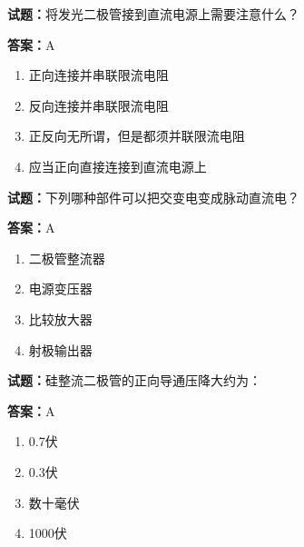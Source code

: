 \documentclass{ctexbook}
\begin{document}




\vspace{1em}

\textbf{试题：}将发光二极管接到直流电源上需要注意什么？ 

\textbf{答案：}A 

\begin{enumerate}[leftmargin=3em]
  \item 正向连接并串联限流电阻 

  \item 反向连接并串联限流电阻 

  \item 正反向无所谓，但是都须并联限流电阻 

  \item 应当正向直接连接到直流电源上 

\end{enumerate}





\vspace{1em}

\textbf{试题：}下列哪种部件可以把交变电变成脉动直流电？ 

\textbf{答案：}A 

\begin{enumerate}[leftmargin=3em]
  \item 二极管整流器 

  \item 电源变压器 

  \item 比较放大器 

  \item 射极输出器 

\end{enumerate}





\vspace{1em}

\textbf{试题：}硅整流二极管的正向导通压降大约为： 

\textbf{答案：}A 


\begin{enumerate}[leftmargin=3em]
  \item 0.7伏 

  \item 0.3伏 

  \item 数十毫伏 

  \item 1000伏 

\end{enumerate}
\end{document}
